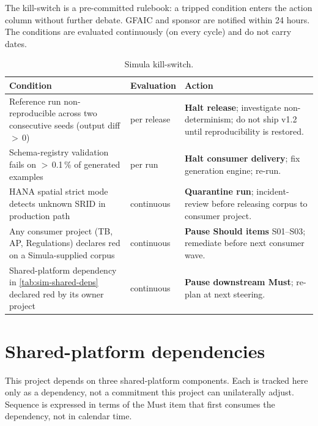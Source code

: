 \documentclass[12pt,a4paper,twoside]{report}
\begin{document}
The kill-switch is a pre-committed rulebook: a tripped condition enters
the action column without further debate. GFAIC and sponsor are
notified within 24 hours. The conditions are evaluated continuously
(on every cycle) and do not carry dates.

\begin{table}[htbp]
\centering
\caption{Simula kill-switch.}
\label{tab:sim-kill-switch}
\footnotesize
\begin{tabularx}{\linewidth}{@{}l l X@{}}
\toprule
\textbf{Condition} & \textbf{Evaluation} & \textbf{Action} \\ \midrule
Reference run non-reproducible across two consecutive seeds (output diff $>$\,0) & per release & \textbf{Halt release}; investigate non-determinism; do not ship v1.2 until reproducibility is restored. \\
Schema-registry validation fails on $>$\,0.1\,\% of generated examples & per run & \textbf{Halt consumer delivery}; fix generation engine; re-run. \\
HANA spatial strict mode detects unknown SRID in production path & continuous & \textbf{Quarantine run}; incident-review before releasing corpus to consumer project. \\
Any consumer project (TB, AP, Regulations) declares red on a Simula-supplied corpus & continuous & \textbf{Pause Should items} S01--S03; remediate before next consumer wave. \\
Shared-platform dependency in \cref{tab:sim-shared-deps} declared red by its owner project & continuous & \textbf{Pause downstream Must}; re-plan at next steering. \\
\bottomrule
\end{tabularx}
\end{table}

\section{Shared-platform dependencies}\label{sec:sim-shared-deps}

This project depends on three shared-platform components. Each is
tracked here only as a dependency, not a commitment this project can
unilaterally adjust. Sequence is expressed in terms of the Must item
that first consumes the dependency, not in calendar time.
\end{document}

